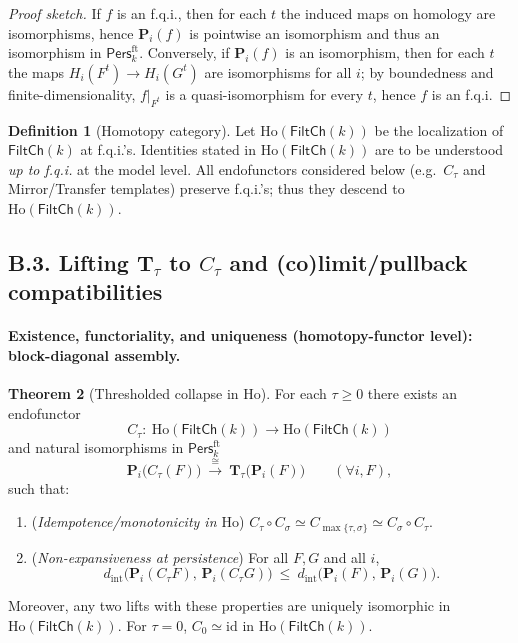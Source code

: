 \documentclass[11pt]{article}
\numberwithin{equation}{section}
\theoremstyle{plain}
\theoremstyle{definition}
\theoremstyle{remark}
\newcommand{\Pers}{\mathsf{Pers}}
\newcommand{\Ho}{\mathrm{Ho}}
\theoremstyle{plain}
\theoremstyle{definition}
\numberwithin{equation}{section}
\newtheorem{theorem}{Theorem}[section]
\theoremstyle{definition}
\newtheorem{definition}[theorem]{Definition}
\numberwithin{equation}{section}
\theoremstyle{plain}
\theoremstyle{definition}
\theoremstyle{remark}
\begin{document}
\begin{proof}[Proof sketch]
If \(f\) is an f.q.i., then for each \(t\) the induced maps on homology are isomorphisms, hence \(\mathbf{P}_i(f)\) is pointwise an isomorphism and thus an isomorphism in \(\Pers^{\mathrm{ft}}_k\).
Conversely, if \(\mathbf{P}_i(f)\) is an isomorphism, then for each \(t\) the maps \(H_i(F^t)\to H_i(G^t)\) are isomorphisms for all \(i\); by boundedness and finite-dimensionality, \(f|_{F^t}\) is a quasi-isomorphism for every \(t\), hence \(f\) is an f.q.i.
\end{proof}

\begin{definition}[Homotopy category]
Let \(\Ho(\mathsf{FiltCh}(k))\) be the localization of \(\mathsf{FiltCh}(k)\) at f.q.i.’s.
Identities stated in \(\Ho(\mathsf{FiltCh}(k))\) are to be understood \emph{up to f.q.i.} at the model level.
All endofunctors considered below (e.g.\ \(C_\tau\) and Mirror/Transfer templates) preserve f.q.i.’s; thus they descend to \(\Ho(\mathsf{FiltCh}(k))\).
\end{definition}

\subsection*{B.3. Lifting \texorpdfstring{$\mathbf{T}_\tau$}{T\_\tau} to \texorpdfstring{$C_\tau$}{C\_\tau} and (co)limit/pullback compatibilities}

\paragraph*{Existence, functoriality, and uniqueness (homotopy-functor level): block-diagonal assembly.}
\begin{theorem}[Thresholded collapse in \(\Ho\)]\label{B:thm:Ctau}
For each \(\tau\ge 0\) there exists an endofunctor
\[
C_\tau:\ \Ho(\mathsf{FiltCh}(k))\longrightarrow \Ho(\mathsf{FiltCh}(k))
\]
and natural isomorphisms in \(\Pers^{\mathrm{ft}}_k\)
\[
\mathbf{P}_i\!\big(C_\tau(F)\big)\ \xrightarrow{\ \cong\ }\ \mathbf{T}_\tau\!\big(\mathbf{P}_i(F)\big)\qquad(\forall i,F),
\]
such that:
\begin{enumerate}\itemsep0.2em
  \item (\emph{Idempotence/monotonicity in \(\Ho\)})
  \(C_\tau\circ C_\sigma \simeq C_{\max\{\tau,\sigma\}}\simeq C_\sigma\circ C_\tau\).
  \item (\emph{Non-expansiveness at persistence})
  For all \(F,G\) and all \(i\),
  \[
  d_{\mathrm{int}}\!\big(\mathbf{P}_i(C_\tau F),\,\mathbf{P}_i(C_\tau G)\big)\ \le\ d_{\mathrm{int}}\!\big(\mathbf{P}_i(F),\,\mathbf{P}_i(G)\big).
  \]
\end{enumerate}
Moreover, any two lifts with these properties are uniquely isomorphic in \(\Ho(\mathsf{FiltCh}(k))\).
For \(\tau=0\), \(C_0\simeq \mathrm{id}\) in \(\Ho(\mathsf{FiltCh}(k))\).
\end{theorem}
\end{document}
